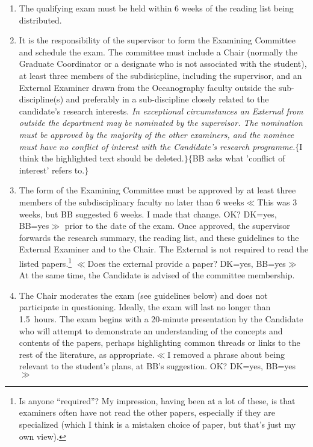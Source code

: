 \documentclass[12pt]{article}
\newcommand{\fixme}[1]{\color{fixmeColor}$\{$#1$\}$\color{black}\index{$>>>>$FIXME$<<<<$}}
\newcommand{\vote}[1]{\color{voteColor}$\ll$#1$\gg$\color{black}\marginpar[$\gg$ vote]{$\ll$ vote}\index{$>>>>$VOTE$<<<<$}}
\newcommand{\discuss}[1]{\footnote{\color{fixmeColor}#1\color{black}}\index{$>>>>$DISCUSS$<<<<$}}
\newcommand{\supervisor}{supervisor\xspace}
\newcommand{\GC}{Graduate Coordinator\xspace}
\begin{document}
\begin{enumerate}
    \item The qualifying exam must be held within 6 weeks of the reading list
        being distributed. 

    \item It is the responsibility of the \supervisor to form the Examining
        Committee and schedule the exam. The committee must include a Chair (normally
        the \GC or a designate who is not associated with the student),
        at least three members of
        the subdisicpline, including the \supervisor, and an External Examiner
        drawn from the Oceanography faculty outside the sub-discipline(s) and
        preferably in a sub-discipline closely related to the candidate’s
        research interests. \emph{In exceptional circumstances an External from
        outside the department may be nominated by the \supervisor. The
        nomination must be approved by the majority of the other
        examiners, and the
        nominee must have no conflict of interest with the Candidate's research
        programme.}\fixme{I think the highlighted text should be
        deleted.}\fixme{BB asks what 'conflict of interest' refers to.}

    \item The form of the Examining Committee must be approved by at least
        three members of the subdisciplinary faculty no later than 6 weeks\vote{This was 3 weeks, but BB suggested 6 weeks. I made that change. OK? DK=yes, BB=yes}
        prior to the date of the exam. Once approved, the \supervisor forwards
        the research summary, the reading list, and these guidelines to the
        External Examiner and to the Chair. The External is not required to
        read the listed papers.\discuss{Is anyone ``required''? My impression,
        having been at a lot of these, is that examiners often have not read
        the other papers, especially if they are specialized (which I think
        is a mistaken choice of paper, but that's just my own view).}
        \vote{Does the external provide a paper? DK=yes, BB=yes}
        At the same time, the Candidate is
        advised of the committee membership. 

    \item The Chair moderates the exam (see guidelines below) and does not
        participate in questioning. Ideally, the exam will last no longer than
        1.5~hours. The exam begins with a 20-minute presentation by the
        Candidate who will attempt to demonstrate an understanding of the
        concepts and contents of the papers, perhaps highlighting common
        threads or links to the rest of the literature,
        as appropriate.\vote{I removed a phrase about being relevant to the
        student's plans, at BB's suggestion. OK? DK=yes, BB=yes}


\end{enumerate}
\end{document}
